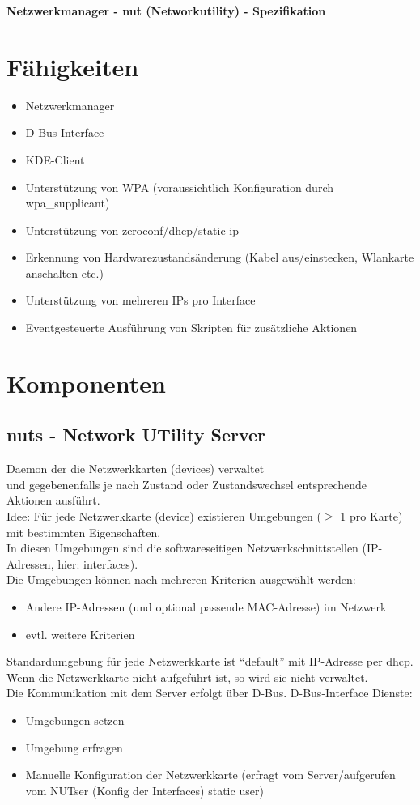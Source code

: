 \documentclass[a4paper,10pt]{scrartcl}
\begin{document}
\begin{Large}\textbf{Netzwerkmanager - nut (Networkutility) - Spezifikation}\end{Large}


\section*{Fähigkeiten}
\begin{itemize}
\item Netzwerkmanager
\item D-Bus-Interface
\item KDE-Client
\item Unterstützung von WPA (voraussichtlich Konfiguration durch wpa\_supplicant)
\item Unterstützung von zeroconf/dhcp/static ip
\item Erkennung von Hardwarezustandsänderung (Kabel aus/einstecken, Wlankarte anschalten etc.)
\item Unterstützung von mehreren IPs pro Interface 
\item Eventgesteuerte Ausführung von Skripten für zusätzliche Aktionen
\end{itemize}


\section*{Komponenten}
\subsection*{nuts - Network UTility Server}
Daemon der die Netzwerkkarten (devices) verwaltet \\
und gegebenenfalls je nach Zustand oder Zustandswechsel entsprechende Aktionen ausführt. \\
Idee:
Für jede Netzwerkkarte (device) existieren Umgebungen ($\geq$ 1 pro Karte) mit bestimmten Eigenschaften. \\
In diesen Umgebungen sind die softwareseitigen Netzwerkschnittstellen (IP-Adressen, hier: interfaces).\\
Die Umgebungen können nach mehreren Kriterien ausgewählt werden:
\begin{itemize}
 \item Andere IP-Adressen (und optional passende MAC-Adresse) im Netzwerk
 \item evtl. weitere Kriterien
\end{itemize}
Standardumgebung für jede Netzwerkkarte ist ``default'' mit IP-Adresse per dhcp. \\
Wenn die Netzwerkkarte nicht aufgeführt ist, so wird sie nicht verwaltet.\\
Die Kommunikation mit dem Server erfolgt über D-Bus.
D-Bus-Interface Dienste:
\begin{itemize}
 \item Umgebungen setzen
 \item Umgebung erfragen
 \item Manuelle Konfiguration der Netzwerkkarte (erfragt vom Server/aufgerufen vom NUTser (Konfig der Interfaces) static user)
\end{itemize}
\end{document}
